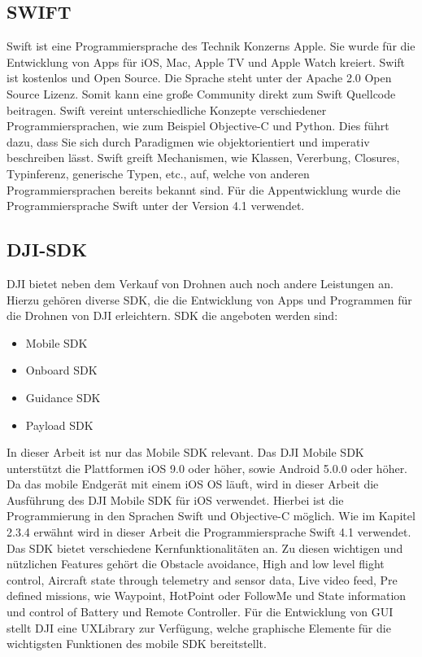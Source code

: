 \subsection{SWIFT}\label{subsec:SWIFT}
Swift ist eine Programmiersprache des Technik Konzerns Apple. Sie wurde für die Entwicklung von Apps für iOS, Mac, Apple TV und Apple Watch kreiert. Swift ist kostenlos und Open Source. Die Sprache steht unter der Apache 2.0 Open Source Lizenz. Somit kann eine große Community direkt zum Swift Quellcode beitragen. 
\newline
Swift vereint unterschiedliche Konzepte verschiedener Programmiersprachen, wie zum Beispiel Objective-C und Python. Dies führt dazu, dass Sie sich durch Paradigmen wie objektorientiert und imperativ beschreiben lässt. Swift greift Mechanismen, wie Klassen, Vererbung, Closures, Typinferenz, generische Typen, etc., auf, welche von anderen Programmiersprachen bereits bekannt sind. 
\newline
Für die Appentwicklung wurde die Programmiersprache Swift unter der Version 4.1 verwendet. 

\subsection{DJI-\acf{SDK}}\label{subsec:DJI-SDK}
DJI bietet neben dem Verkauf von Drohnen auch noch andere Leistungen an. Hierzu gehören diverse \acs{SDK}, die die Entwicklung von Apps und Programmen für die Drohnen von DJI erleichtern. 
\acs{SDK} die angeboten werden sind:
\begin{itemize}
	\item Mobile SDK
	\item Onboard SDK
	\item Guidance SDK
	\item Payload SDK
\end{itemize}
In dieser Arbeit ist nur das Mobile SDK relevant. 
\newline
Das DJI Mobile SDK unterstützt die Plattformen iOS 9.0 oder höher, sowie Android 5.0.0 oder höher. Da das mobile Endgerät mit einem iOS \acs{OS} läuft, wird in dieser Arbeit die Ausführung des DJI Mobile SDK für iOS verwendet. Hierbei ist die Programmierung in den Sprachen Swift und Objective-C möglich. Wie im Kapitel 2.3.4 erwähnt wird in dieser Arbeit die Programmiersprache Swift 4.1 verwendet. 
\newline
Das SDK bietet verschiedene Kernfunktionalitäten an. Zu diesen wichtigen und nützlichen Features gehört die Obstacle avoidance,  High and low level flight control, Aircraft state through telemetry and sensor data, Live video feed, Pre defined missions, wie Waypoint, HotPoint oder FollowMe und State information und control of Battery und Remote Controller. 
\newline
Für die Entwicklung von \acs{GUI} stellt DJI eine UXLibrary zur Verfügung, welche graphische Elemente für die wichtigsten Funktionen des mobile \acs{SDK} bereitstellt.


